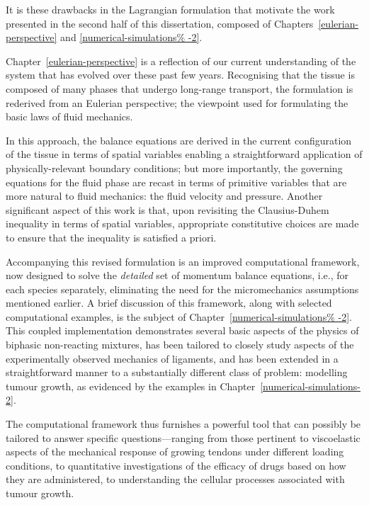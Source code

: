It is these drawbacks in the Lagrangian formulation that motivate the
work presented in the second half of this dissertation, composed of
Chapters~\ref{eulerian-perspective} and \ref{numerical-simulations%
  -2}.

Chapter~\ref{eulerian-perspective} is a reflection of our current
understanding of the system that has evolved over these past few
years. Recognising that the tissue is composed of many phases that
undergo long-range transport, the formulation is rederived from an
Eulerian perspective; the viewpoint used for formulating the basic
laws of fluid mechanics.

In this approach, the balance equations are derived in the current
configuration of the tissue in terms of spatial variables enabling a
straightforward application of physically-relevant boundary
conditions; but more importantly, the governing equations for the
fluid phase are recast in terms of primitive variables that are more
natural to fluid mechanics: the fluid velocity and pressure. Another
significant aspect of this work is that, upon revisiting the
Clausius-Duhem inequality in terms of spatial variables, appropriate
constitutive choices are made to ensure that the inequality is
satisfied a priori.

Accompanying this revised formulation is an improved computational
framework, now designed to solve the {\em detailed} set of momentum
balance equations, i.e., for each species separately, eliminating the
need for the micromechanics assumptions mentioned earlier. A brief
discussion of this framework, along with selected computational
examples, is the subject of Chapter~\ref{numerical-simulations%
  -2}. This coupled implementation demonstrates several basic aspects
of the physics of biphasic non-reacting mixtures, has been tailored to
closely study aspects of the experimentally observed mechanics of
ligaments, and has been extended in a straightforward manner to a
substantially different class of problem: modelling tumour growth, as
evidenced by the examples in Chapter~\ref{numerical-simulations-2}.

The computational framework thus furnishes a powerful tool that can
possibly be tailored to answer specific questions---ranging from those
pertinent to viscoelastic aspects of the mechanical response of
growing tendons under different loading conditions, to quantitative
investigations of the efficacy of drugs based on how they are
administered, to understanding the cellular processes associated with
tumour growth.

